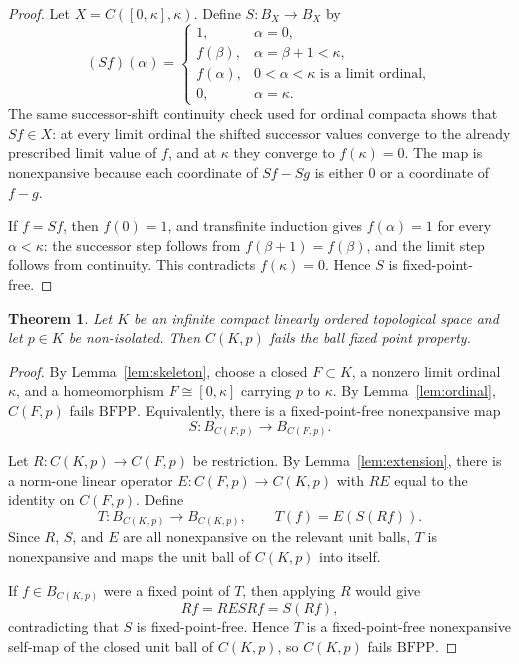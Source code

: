 \documentclass[11pt]{article}
\newtheorem{theorem}{Theorem}
\newcommand{\BFPP}{\mathrm{BFPP}}
\begin{document}
\begin{proof}
Let \(X=C([0,\kappa],\kappa)\).  Define \(S:B_X\to B_X\) by
\[
(Sf)(\alpha)=
\begin{cases}
1, & \alpha=0,\\
f(\beta), & \alpha=\beta+1<\kappa,\\
f(\alpha), & 0<\alpha<\kappa \text{ is a limit ordinal},\\
0, & \alpha=\kappa.
\end{cases}
\]
The same successor-shift continuity check used for ordinal compacta shows
that \(Sf\in X\): at every limit ordinal the shifted successor values converge
to the already prescribed limit value of \(f\), and at \(\kappa\) they
converge to \(f(\kappa)=0\).  The map is nonexpansive because each coordinate
of \(Sf-Sg\) is either \(0\) or a coordinate of \(f-g\).

If \(f=Sf\), then \(f(0)=1\), and transfinite induction gives
\(f(\alpha)=1\) for every \(\alpha<\kappa\): the successor step follows from
\(f(\beta+1)=f(\beta)\), and the limit step follows from continuity.  This
contradicts \(f(\kappa)=0\).  Hence \(S\) is fixed-point-free.
\end{proof}

\begin{theorem}\label{thm:lots}
Let \(K\) be an infinite compact linearly ordered topological space and let
\(p\in K\) be non-isolated.  Then \(C(K,p)\) fails the ball fixed point
property.
\end{theorem}

\begin{proof}
By Lemma~\ref{lem:skeleton}, choose a closed \(F\subset K\), a nonzero limit
ordinal \(\kappa\), and a homeomorphism \(F\cong[0,\kappa]\) carrying \(p\) to
\(\kappa\).  By Lemma~\ref{lem:ordinal}, \(C(F,p)\) fails \(\BFPP\).
Equivalently, there is a fixed-point-free nonexpansive map
\[
  S:B_{C(F,p)}\longrightarrow B_{C(F,p)} .
\]

Let \(R:C(K,p)\to C(F,p)\) be restriction.  By Lemma~\ref{lem:extension},
there is a norm-one linear operator \(E:C(F,p)\to C(K,p)\) with \(R E\) equal
to the identity on \(C(F,p)\).  Define
\[
  T:B_{C(K,p)}\longrightarrow B_{C(K,p)},\qquad T(f)=E(S(Rf)).
\]
Since \(R\), \(S\), and \(E\) are all nonexpansive on the relevant unit balls,
\(T\) is nonexpansive and maps the unit ball of \(C(K,p)\) into itself.

If \(f\in B_{C(K,p)}\) were a fixed point of \(T\), then applying \(R\) would
give
\[
  Rf = R E S Rf = S(Rf),
\]
contradicting that \(S\) is fixed-point-free.  Hence \(T\) is a
fixed-point-free nonexpansive self-map of the closed unit ball of \(C(K,p)\),
so \(C(K,p)\) fails \(\BFPP\).
\end{proof}
\end{document}
